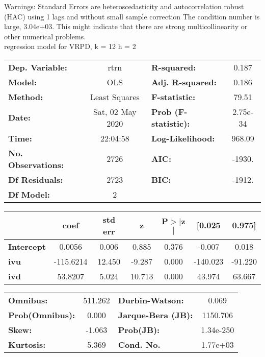 Warnings: \newline
 [1] Standard Errors are heteroscedasticity and autocorrelation robust (HAC) using 1 lags and without small sample correction \newline
 [2] The condition number is large, 3.04e+03. This might indicate that there are \newline
 strong multicollinearity or other numerical problems.\\ 

regression model for VRPD, k = 12 h = 2\begin{center}
\begin{tabular}{lclc}
\toprule
\textbf{Dep. Variable:}    &       rtrn       & \textbf{  R-squared:         } &     0.187   \\
\textbf{Model:}            &       OLS        & \textbf{  Adj. R-squared:    } &     0.186   \\
\textbf{Method:}           &  Least Squares   & \textbf{  F-statistic:       } &     79.51   \\
\textbf{Date:}             & Sat, 02 May 2020 & \textbf{  Prob (F-statistic):} &  2.75e-34   \\
\textbf{Time:}             &     22:04:58     & \textbf{  Log-Likelihood:    } &    968.09   \\
\textbf{No. Observations:} &        2726      & \textbf{  AIC:               } &    -1930.   \\
\textbf{Df Residuals:}     &        2723      & \textbf{  BIC:               } &    -1912.   \\
\textbf{Df Model:}         &           2      & \textbf{                     } &             \\
\bottomrule
\end{tabular}
\begin{tabular}{lcccccc}
                   & \textbf{coef} & \textbf{std err} & \textbf{z} & \textbf{P$> |$z$|$} & \textbf{[0.025} & \textbf{0.975]}  \\
\midrule
\textbf{Intercept} &       0.0056  &        0.006     &     0.885  &         0.376        &       -0.007    &        0.018     \\
\textbf{ivu}       &    -115.6214  &       12.450     &    -9.287  &         0.000        &     -140.023    &      -91.220     \\
\textbf{ivd}       &      53.8207  &        5.024     &    10.713  &         0.000        &       43.974    &       63.667     \\
\bottomrule
\end{tabular}
\begin{tabular}{lclc}
\textbf{Omnibus:}       & 511.262 & \textbf{  Durbin-Watson:     } &     0.069  \\
\textbf{Prob(Omnibus):} &   0.000 & \textbf{  Jarque-Bera (JB):  } &  1150.706  \\
\textbf{Skew:}          &  -1.063 & \textbf{  Prob(JB):          } & 1.34e-250  \\
\textbf{Kurtosis:}      &   5.369 & \textbf{  Cond. No.          } &  1.77e+03  \\
\bottomrule
\end{tabular}
\end{center}

